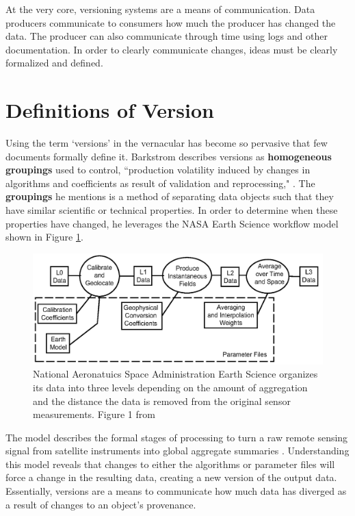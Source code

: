 At the very core, versioning systems are a means of communication.
Data producers communicate to consumers how much the producer has changed the data.
The producer can also communicate through time using logs and other documentation.
In order to clearly communicate changes, ideas must be clearly formalized and defined.

\section{Definitions of Version}

Using the term `versions' in the vernacular has become so pervasive that few documents formally define it.
Barkstrom describes versions as \textbf{homogeneous groupings} used to control, ``production volatility induced by changes in algorithms and coefficients as result of validation and reprocessing," \cite{Barkstrom2003}.
The \textbf{groupings} he mentions is a method of separating data objects such that they have similar scientific or technical properties.
In order to determine when these properties have changed, he leverages the NASA Earth Science workflow model shown in Figure \ref{NASALevels}.
\begin{figure}
	\centering
	\includegraphics[scale=0.35]{figures/NASALevels.png}
	\caption[National Aeronautics and Space Administration Earth Science organizes its data into three levels depending on the amount of aggregation and the distance the data is removed from the original sensor measurements.]{National Aeronatuics Space Administration Earth Science organizes its data into three levels depending on the amount of aggregation and the distance the data is removed from the original sensor measurements. Figure 1 from \cite{Barkstrom2003}}
	\label{NASALevels}
\end{figure}
The model describes the formal stages of processing to turn a raw remote sensing signal from satellite instruments into global aggregate summaries \cite{Barkstrom2003}.
Understanding this model reveals that changes to either the algorithms or parameter files will force a change in the resulting data, creating a new version of the output data.
Essentially, versions are a means to communicate how much data has diverged as a result of changes to an object's provenance.

